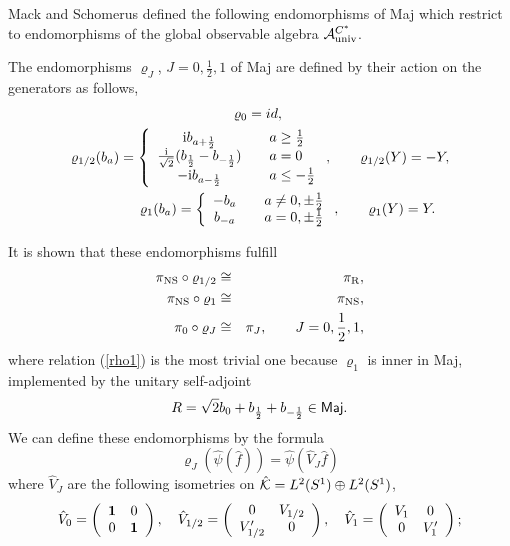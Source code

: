 \documentclass[10pt,a4paper]{article}
\begin{document}
Mack and Schomerus \cite{MS1,MS2} defined the following
endomorphisms of {\sf Maj} which restrict to endomorphisms
of the global observable algebra ${\cal A}_{\rm univ}^{C^*}$.
\begin{definition}
\label{endo}
The endomorphisms $\varrho_J$,
$J=0,\frac{1}{2},1$ of {\sf Maj} are defined by their
action on the generators as follows,
\begin{eqnarray}
\varrho_0 = id ,\qquad \qquad \qquad \qquad \qquad \qquad\\
\varrho_{1/2}(b_a) = \left\{ \begin{array}{cl}
{\rm i} b_{a+\frac{1}{2}} & \quad a \ge \frac{1}{2} \\
\frac{{\rm i}}{\sqrt{2}} (b_\frac{1}{2}-b_{-\frac{1}{2}}) & \quad a=0 \\
- {\rm i} b_{a-\frac{1}{2}} & \quad a\le -\frac{1}{2} \end{array}\right.
,\qquad \varrho_{1/2}(Y)=-Y ,\\
\varrho_1(b_a)= \left\{ \begin{array}{cl} -b_a & \quad a \neq
0, \pm \frac{1}{2} \\
b_{-a} & \quad a = 0, \pm \frac{1}{2}  \end{array} \right.
,\qquad \varrho_1(Y)=Y .\quad
\end{eqnarray}
\end{definition}
It is shown \cite{MS1} that these endomorphisms fulfill
\begin{eqnarray}
\pi_{\rm NS} \circ \varrho_{1/2} &\cong& \pi_{\rm R},\\
\label{rho1}
\pi_{\rm NS} \circ \varrho_1 &\cong& \pi_{\rm NS},\\
\pi_0 \circ \varrho_J &\cong& \pi_J, \qquad J=0,
\frac{1}{2},1,
\end{eqnarray}
where relation (\ref{rho1}) is the most trivial one because
$\varrho_1$ is inner in {\sf Maj}, implemented by the
unitary self-adjoint
\[ R=\sqrt{2}b_0+b_\frac{1}{2}+b_{-\frac{1}{2}}
\in \mbox{\sf Maj}. \]
We can define these endomorphisms by the formula
\[ \varrho_J(\hat{\psi}(\hat{f}))=
\hat{\psi}(\hat{V}_J\hat{f}) \]
where $\hat{V}_J$ are the following isometries on
$\hat{\cal K}=L^2(S^1)\oplus L^2(S^1)$,
\begin{equation}
\label{matrix}
{\hat{V}}_0=\left( \begin{array}{cc}
{\bf 1} & 0 \\ 0 & {\bf 1}
\end{array} \right),\quad
{\hat{V}}_{1/2} =\left( \begin{array}{cc} 0 &
V_{1/2} \\ V_{1/2}' & 0
\end{array} \right),\quad
{\hat{V}}_1=\left( \begin{array}{cc} V_1 & 0 \\ 0 & V_1'
\end{array} \right);
\end{equation}
\end{document}
